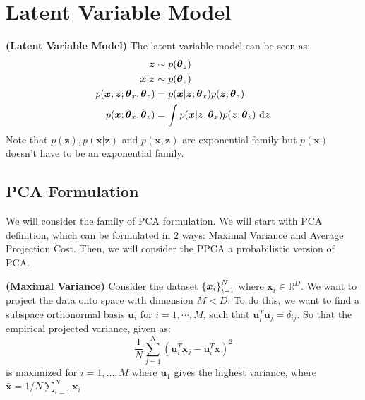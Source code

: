 \section{Latent Variable Model}

\begin{definition}{\textbf{(Latent Variable Model)}}
    The latent variable model can be seen as:
    \begin{equation*}
    \begin{aligned}
        \boldsymbol z &\sim p(\boldsymbol \theta_z) \\
        \boldsymbol x | \boldsymbol z &\sim p(\boldsymbol \theta_z) \\
        p(\boldsymbol x, \boldsymbol z;\boldsymbol \theta_x, \boldsymbol \theta_z) &= p(\boldsymbol x|\boldsymbol z ; \boldsymbol \theta_x)p(\boldsymbol z ; \boldsymbol \theta_z) \\
        p(\boldsymbol x ; \boldsymbol \theta_x, \boldsymbol \theta_z) &= \int p(\boldsymbol x |\boldsymbol z; \boldsymbol \theta_x) p(\boldsymbol z ; \boldsymbol \theta_z) \ \mathrm{d} \boldsymbol z
    \end{aligned}
    \end{equation*}
    Note that $p(\boldsymbol z), p(\boldsymbol x|\boldsymbol z)$ and $p(\boldsymbol x, \boldsymbol z)$ are exponential family but $p(\boldsymbol x)$ doesn't have to be an exponential family. 
\end{definition}

\subsection{PCA Formulation}

\begin{remark}
    We will consider the family of PCA formulation. We will start with PCA definition, which can be formulated in $2$ ways: Maximal Variance and Average Projection Cost. Then, we will consider the PPCA a probabilistic version of PCA. 
\end{remark}

\begin{definition}{\textbf{(Maximal Variance)}}
    Consider the dataset $\left\{ \boldsymbol x_i \right\}^N_{i=1}$ where $\boldsymbol x_i \in \mathbb{R}^D$. We want to project the data onto space with dimension $M < D$. To do this, we want to find a subspace orthonormal basis $\boldsymbol u_i$ for $i=1,\cdots,M$, such that $\boldsymbol u_i^T\boldsymbol u_j = \delta_{ij}$. So that the empirical projected variance, given as:
    \begin{equation*}
        \frac{1}{N}\sum^N_{j=1}(\boldsymbol u_i^T\boldsymbol x_j - \boldsymbol u_i^T\bar{\boldsymbol x})^2
    \end{equation*}
    is maximized for $i=1,\dots,M$ where $\boldsymbol u_1$ gives the highest variance, where $\bar{\boldsymbol x} = 1/N\sum^N_{i=1}\boldsymbol x_i$
\end{definition}


